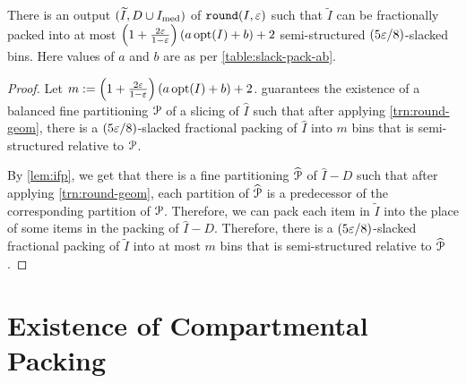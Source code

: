 \begin{theorem}
\label{thm:round}
There is an output $(\widetilde{I}, D \cup I_{\mathrm{med}})$
of $\operatorname{\mathtt{round}}(I, \varepsilon)$ such that $\widetilde{I}$ can be fractionally packed into at most
$\left(1 + \frac{2\varepsilon}{1-\varepsilon}\right)(a\operatorname{opt}(I) + b) + 2$
semi-structured $(5\varepsilon/8)$-slacked bins.
Here values of $a$ and $b$ are as per \cref{table:slack-pack-ab}.
\end{theorem}
\begin{proof}
Let $m := \left(1 + \frac{2\varepsilon}{1-\varepsilon}\right)(a\operatorname{opt}(I) + b) + 2$.
 guarantees the existence of a balanced fine partitioning $\mathcal{P}$
of a slicing of $\widehat{I}$ such that after applying \cref{trn:round-geom},
there is a $(5\varepsilon/8)$-slacked fractional packing of $\widehat{I}$
into $m$ bins that is semi-structured relative to $\mathcal{P}$.

By \cref{lem:ifp}, we get that there is a fine partitioning $\widehat{\mathcal{P}}$
of $\widehat{I} - D$ such that after applying \cref{trn:round-geom},
each partition of $\widehat{\mathcal{P}}$ is a predecessor
of the corresponding partition of $\mathcal{P}$.
Therefore, we can pack each item in $\widetilde{I}$ into the place of some
items in the packing of $\widehat{I} - D$.
Therefore, there is a $(5\varepsilon/8)$-slacked fractional packing of $\widetilde{I}$
into at most $m$ bins that is semi-structured relative to $\widehat{\mathcal{P}}$.
\end{proof}

\section{Existence of Compartmental Packing}
\label{sec:gv-rbbp:compart}

